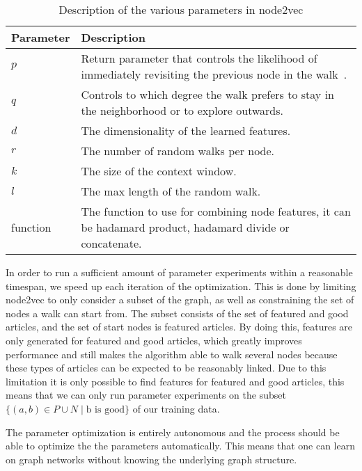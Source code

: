 \begin{table}[tbp]
\centering
\begin{tabular}{@{}lp{}@{}}
\toprule
\textbf{Parameter} & \textbf{Description} \\
\midrule
$p$          &   Return parameter that controls the likelihood of immediately revisiting the previous node in the walk~\cite{node2vec}.   \\
$q$          &   Controls to which degree the walk prefers to stay in the neighborhood or to explore outwards.   \\
$d$          &   The dimensionality of the learned features.   \\
$r$          &   The number of random walks per node.   \\
$k$          &   The size of the context window.   \\
$l$          &   The max length of the random walk.   \\
function     &   The function to use for combining node features, it can be hadamard product, hadamard divide or concatenate.   \\
\bottomrule
\end{tabular}
\caption[Description of parameters in node2vec]{Description of the various parameters in node2vec}%
\label{tab:node2vecparams}
\end{table}


In order to run a sufficient amount of parameter experiments within a reasonable timespan, we speed up each iteration of the optimization.
This is done by limiting node2vec to only consider a subset of the graph, as well as constraining the set of nodes a walk can start from. The subset consists of the set of featured and good articles, and the set of start nodes is featured articles. By doing this, features are only generated for featured and good articles, which greatly improves performance and still makes the algorithm able to walk several nodes because these types of articles can be expected to be reasonably linked. Due to this limitation it is only possible to find features for featured and good articles, this means that we can only run parameter experiments on the subset $\{(a,b) \in P \cup N \mid \text{b is good}\}$ of our training data.

The parameter optimization is entirely autonomous and the process should be able to optimize the the parameters automatically. This means that one can learn on graph networks without knowing the underlying graph structure.

